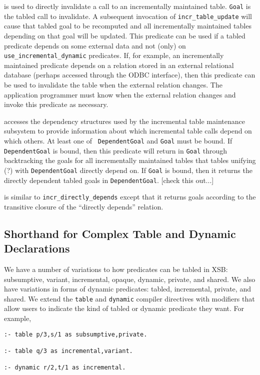 \begin{description}
is used to directly invalidate a call to an incrementally maintained
table.  {\tt Goal} is the tabled call to invalidate.  A subsequent
invocation of {\tt incr\_table\_update} will cause that tabled goal to
be recomputed and all incrementally maintained tables depending on
that goal will be updated.  This predicate can be used if a tabled
predicate depends on some external data and not (only) on {\tt
use\_incremental\_dynamic} predicates.  If, for example, an incrementally
maintained predicate depends on a relation stored in an external
relational database (perhaps accessed through the ODBC interface),
then this predicate can be used to invalidate the table when the
external relation changes.  The application programmer must know when
the external relation changes and invoke this predicate as necessary.

accesses the dependency structures used by the incremental table
maintenance subsystem to provide information about which incremental
table calls depend on which others.  At least one of {\tt
DependentGoal} and {\tt Goal} must be bound.  If {\tt DependentGoal}
is bound, then this predicate will return in {\tt Goal} through
backtracking the goals for all incrementally maintained tables that
tables unifying (?) with {\tt DependentGoal} directly depend on.  If
{\tt Goal} is bound, then it returns the directly dependent tabled
goals in {\tt DependentGoal}.  [check this out...]

is similar to {\tt incr\_directly\_depends} except that it returns
goals according to the transitive closure of the ``directly depends''
relation.
\end{description}

\subsection{Shorthand for Complex Table and Dynamic Declarations}

We have a number of variations to how predicates can be tabled in XSB:
subsumptive, variant, incremental, opaque, dynamic, private, and
shared.  We also have variations in forms of dynamic predicates:
tabled, incremental, private, and shared.  We extend the {\tt table}
and {\tt dynamic} compiler directives with modifiers that allow users
to indicate the kind of tabled or dynamic predicate they want.  For
example,
\begin{verbatim}
:- table p/3,s/1 as subsumptive,private.

:- table q/3 as incremental,variant.

:- dynamic r/2,t/1 as incremental.
\end{verbatim}

